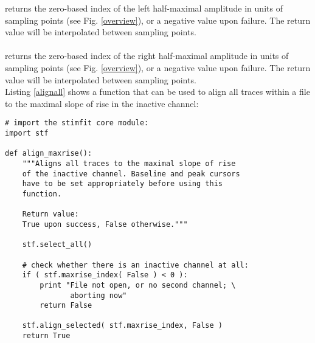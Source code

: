 \noindent returns the zero-based index of the left half-maximal amplitude in units of sampling points (see Fig. \ref{overview}), or a negative value upon failure. The return value will be interpolated between sampling points.\smallskip\\
\\
\noindent  returns the zero-based index of the right half-maximal amplitude in units of sampling points (see Fig. \ref{overview}), or a negative value upon failure. The return value will be interpolated between sampling points.\smallskip\\
Listing \ref{alignall} shows a function that can be used to align all traces within a file to the maximal slope of rise in the inactive channel:
\begin{listing}
\lstset{numbers=left}
\begin{lstlisting}
# import the stimfit core module:
import stf

def align_maxrise():
    """Aligns all traces to the maximal slope of rise 
    of the inactive channel. Baseline and peak cursors
    have to be set appropriately before using this
    function.
    
    Return value:
    True upon success, False otherwise."""
    
    stf.select_all()
    
    # check whether there is an inactive channel at all:
    if ( stf.maxrise_index( False ) < 0 ):
        print "File not open, or no second channel; \
               aborting now"
        return False
        
    stf.align_selected( stf.maxrise_index, False )
    return True

\end{lstlisting}
\lstset{numbers=none}
  \caption {
  }
  \label{alignall}
\end{listing}

